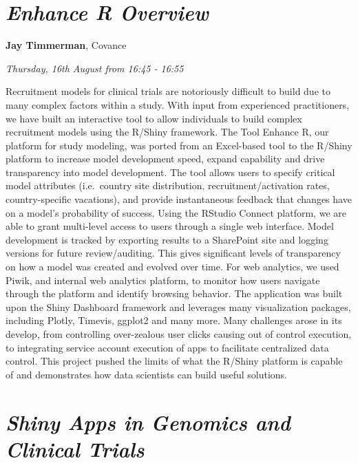 \documentclass[]{book}
\theoremstyle{definition}
\theoremstyle{definition}
\theoremstyle{definition}
\theoremstyle{remark}
\begin{document}
\hypertarget{enhance-r-overview}{%
\section{\texorpdfstring{\emph{Enhance R
Overview}}{Enhance R Overview}}\label{enhance-r-overview}}

\textbf{Jay Timmerman}, Covance

\emph{Thursday, 16th August from 16:45 - 16:55}

Recruitment models for clinical trials are notoriously difficult to
build due to many complex factors within a study. With input from
experienced practitioners, we have built an interactive tool to allow
individuals to build complex recruitment models using the R/Shiny
framework. The Tool Enhance R, our platform for study modeling, was
ported from an Excel-based tool to the R/Shiny platform to increase
model development speed, expand capability and drive transparency into
model development. The tool allows users to specify critical model
attributes (i.e.~country site distribution, recruitment/activation
rates, country-specific vacations), and provide instantaneous feedback
that changes have on a model's probability of success. Using the RStudio
Connect platform, we are able to grant multi-level access to users
through a single web interface. Model development is tracked by
exporting results to a SharePoint site and logging versions for future
review/auditing. This gives significant levels of transparency on how a
model was created and evolved over time. For web analytics, we used
Piwik, and internal web analytics platform, to monitor how users
navigate through the platform and identify browsing behavior. The
application was built upon the Shiny Dashboard framework and leverages
many visualization packages, including Plotly, Timevis, ggplot2 and many
more. Many challenges arose in its develop, from controlling
over-zealous user clicks causing out of control execution, to
integrating service account execution of apps to facilitate centralized
data control. This project pushed the limits of what the R/Shiny
platform is capable of and demonstrates how data scientists can build
useful solutions.

\hypertarget{shiny-apps-in-genomics-and-clinical-trials}{%
\section{\texorpdfstring{\emph{Shiny Apps in Genomics and Clinical
Trials}}{Shiny Apps in Genomics and Clinical Trials}}\label{shiny-apps-in-genomics-and-clinical-trials}}
\end{document}

